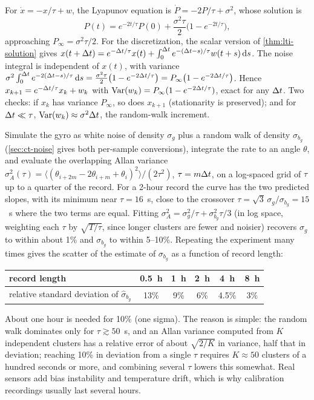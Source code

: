 \begin{solutions}
  \item For $\dot x = -x/\tau + w$, the Lyapunov equation is $\dot P = -2P/\tau + \sigma^2$, whose solution is
        \[
          P(t) = e^{-2t/\tau}P(0) + \frac{\sigma^2\tau}{2}\big(1 - e^{-2t/\tau}\big),
        \]
        approaching $P_\infty = \sigma^2\tau/2$. For the discretization, the scalar version of \cref{thm:lti-solution} gives
        $x(t + {\Delta t}) = e^{-{\Delta t}/\tau}x(t) + \int_0^{{\Delta t}}e^{-({\Delta t} - s)/\tau}w(t + s)\,\mathrm{d} s$. The noise integral is independent of $x(t)$, with variance
        $\sigma^2\int_0^{\Delta t} e^{-2({\Delta t} - s)/\tau}\,\mathrm{d} s = \frac{\sigma^2\tau}{2}\big(1 - e^{-2{\Delta t}/\tau}\big) = P_\infty\big(1 - e^{-2{\Delta t}/\tau}\big)$. Hence
        $x_{k+1} = e^{-{\Delta t}/\tau}x_k + w_k$ with $\operatorname{Var}(w_k) = P_\infty(1 - e^{-2{\Delta t}/\tau})$, exact for any ${\Delta t}$. Two checks: if $x_k$ has variance $P_\infty$, so does
        $x_{k+1}$ (stationarity is preserved); and for ${\Delta t} \ll \tau$, $\operatorname{Var}(w_k) \approx \sigma^2{\Delta t}$, the random-walk increment.

  \item Simulate the gyro as white noise of density $\sigma_g$ plus a random walk of density $\sigma_{b_g}$ (\cref{sec:ct-noise} gives both per-sample
        conversions), integrate the rate to an angle $\theta$, and evaluate the overlapping Allan variance
        $\sigma_A^2(\tau) = \langle(\theta_{i+2m} - 2\theta_{i+m} + \theta_i)^2\rangle/(2\tau^2)$, $\tau = m{\Delta t}$, on a log-spaced grid of $\tau$ up to a quarter of the
        record. For a 2-hour record the curve has the two predicted slopes, with its minimum near $\tau = 16$~s, close to the crossover
        $\tau = \sqrt3\,\sigma_g/\sigma_{b_g} = 15$~s where the two terms are equal. Fitting $\sigma_A^2 = \sigma_g^2/\tau + \sigma_{b_g}^2\tau/3$ (in log space, weighting each
        $\tau$ by $\sqrt{T/\tau}$, since longer clusters are fewer and noisier) recovers $\sigma_g$ to within about 1\% and $\sigma_{b_g}$ to within 5--10\%.
        Repeating the experiment many times gives the scatter of the estimate of $\sigma_{b_g}$ as a function of record length:
        \begin{center}\small
        \begin{tabular}{@{}l c c c c c@{}}
        \toprule
        record length & 0.5~h & 1~h & 2~h & 4~h & 8~h \\
        \midrule
        relative standard deviation of $\hat\sigma_{b_g}$ & 13\% & 9\% & 6\% & 4.5\% & 3\% \\
        \bottomrule
        \end{tabular}
        \end{center}
        About one hour is needed for 10\% (one sigma). The reason is simple: the random walk dominates only for $\tau \gtrsim 50$~s, and an Allan
        variance computed from $K$ independent clusters has a relative error of about $\sqrt{2/K}$ in variance, half that in deviation; reaching
        10\% in deviation from a single $\tau$ requires $K \approx 50$ clusters of a hundred seconds or more, and combining several $\tau$ lowers this
        somewhat. Real sensors add bias instability and temperature drift, which is why
        calibration recordings usually last several hours.
\end{solutions}

